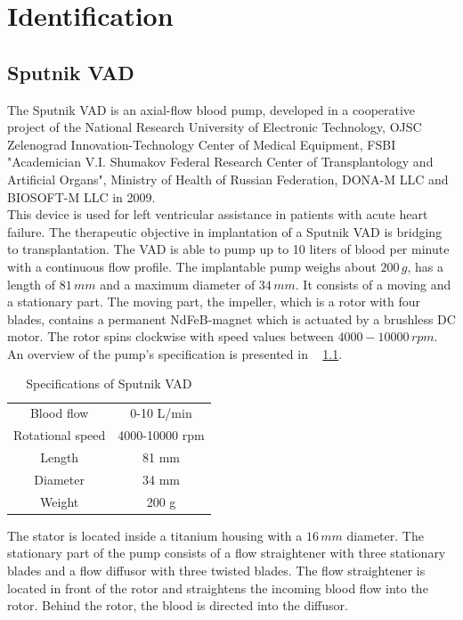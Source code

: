 \chapter{Identification}
\section{Sputnik VAD}\label{Sputnik}
The Sputnik VAD is an axial-flow blood pump, developed in a cooperative project of the National Research University of Electronic Technology, OJSC Zelenograd Innovation-Technology Center of Medical Equipment, FSBI "Academician V.I. Shumakov Federal Research Center of Transplantology and Artificial Organs", Ministry of Health of Russian Federation, DONA-M LLC and BIOSOFT-M LLC in 2009. \cite{Sputnik1}
\\This device is used for left ventricular assistance in patients with acute heart failure. The therapeutic objective in implantation of a Sputnik VAD is bridging to transplantation. The VAD is able to pump up to 10 liters of blood per minute with a continuous flow profile. The implantable pump weighs about $200\, g$, has a length of $81\, mm$ and a maximum diameter of $34\, mm$. It consists of a moving and a stationary part. The moving part, the impeller, which is a rotor with four blades, contains a permanent NdFeB-magnet which is actuated by a brushless DC motor. The rotor spins clockwise with speed values between $4000-10000\, rpm$. An overview of the pump's specification is presented in \tablename~ \ref{tab:sput1}.
\begin{table}[h]
  \centering
  \begin{tabular}{c|c}
    \toprule
    Blood flow  & 0-10 L/min \\
    Rotational speed & 4000-10000 rpm \\
    Length & 81 mm \\
    Diameter & 34 mm \\
    Weight & 200 g \\
    \bottomrule
\end{tabular}
  \caption[Specifications of Sputnik VAD]{Specifications of Sputnik VAD}
  \label{tab:sput1}
\end{table}
The stator is located inside a titanium housing with a $16\, mm$ diameter. The stationary part of the pump consists of a flow straightener with three stationary blades and a flow diffusor with three twisted blades. The flow straightener is located in front of the rotor and straightens the incoming blood flow into the rotor. Behind the rotor, the blood is directed into the diffusor. %
